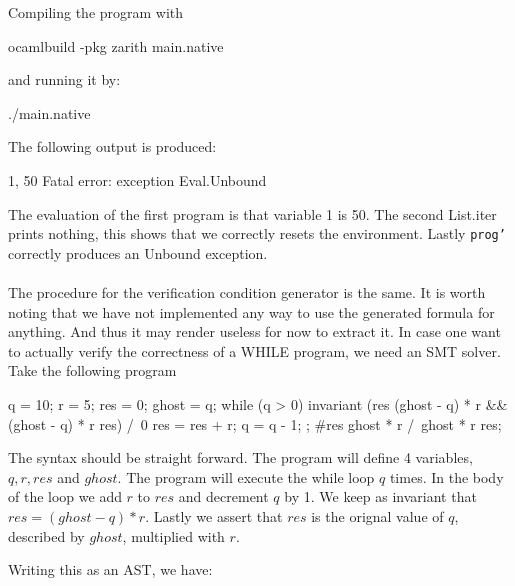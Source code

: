 Compiling the program with

\begin{lstlistings}
\textdollar ocamlbuild -pkg zarith main.native
\end{lstlistings}

and running it by:

\begin{lstlistings}
\textdollar ./main.native
\end{lstlistings}

The following output is produced:

\begin{lstlistings}
1, 50
Fatal error: exception Eval.Unbound
\end{lstlistings}

The evaluation of the first program is that variable 1 is 50. The second List.iter prints nothing,
this shows that we correctly resets the environment. Lastly \texttt{prog'} correctly produces an Unbound exception.
\\~\\
The procedure for the verification condition generator is the same.
It is worth noting that we have not implemented any way to use the generated formula for anything.
And thus it may render useless for now to extract it.
In case one want to actually verify the correctness of a WHILE program, we need an SMT solver.
Take the following program

\begin{lstlistings}[caption={WHILE program which multiples q and r by repeated addition},label={lst:whileexample},language=sml]
q = 10;
r = 5;
res = 0;
ghost = q;
while (q > 0)
invariant {(res \leq (ghost - q) * r && (ghost - q) * r \leq res) /\ 0 \leq} {
      res = res + r;
      q = q - 1;
};
#{res \leq ghost * r /\ ghost * r \leq res};
\end{lstlistings}

The syntax should be straight forward. The program will define 4 variables, $q,r,res$ and $ghost$.
The program will execute the while loop $q$ times. In the body of the loop we add $r$ to $res$ and decrement $q$ by 1. We keep as invariant that $res = (ghost - q) * r$. Lastly we assert that $res$ is the orignal value of $q$, described by $ghost$, multiplied with $r$.

Writing this as an AST, we have:

